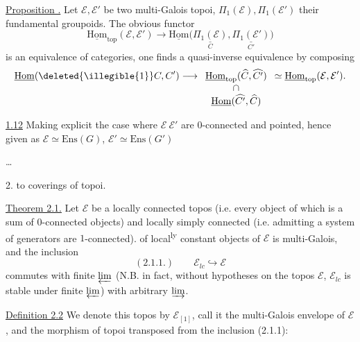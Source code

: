 
\uline{Proposition .} Let $\mathcal E,\mathcal E'$ be two multi-Galois topoi, $\Pi_1(\mathcal E),\Pi_1(\mathcal E')$ their fundamental groupoids. The obvious functor
\[
\underline{\mathrm{Hom}}_{\mathrm{top}}(\mathcal E,\mathcal E')
\longrightarrow
\underline{\mathrm{Hom}}\bigl(
\underset{C}{\underline{\Pi_1(\mathcal E)}},
\underset{C'}{\underline{\Pi_1(\mathcal E')}}\bigr)
\]
is an equivalence of categories, one finds a quasi-inverse equivalence by composing
\[
\underline{\mathrm{Hom}}(\deleted{\illegible{1}}C,C')
\longrightarrow
\begin{array}[t]{c}
\underline{\mathrm{Hom}}_{\mathrm{top}}(\widehat C,\widehat {C'})\\
\cap\\
\underline{\mathrm{Hom}}(\widehat {C'},\widehat C)
\end{array}
\simeq
\underline{\mathrm{Hom}}_{\mathrm{top}}(\mathcal E,\mathcal E').
\]

\uline{1.12} Making explicit the case where $\mathcal E\ \mathcal E'$ are $0$-connected and pointed, hence given as $\mathcal E\simeq\mathrm{Ens}(G)$, $\mathcal E'\simeq\mathrm{Ens}(G')$

\dots



2.  to coverings of topoi.

\uline{Theorem 2.1.} Let $\mathcal E$ be a locally connected topos (i.e. every object of which is a sum of $0$-connected objects) and locally simply connected (i.e. admitting a system of generators  are $1$-connected).
 of local\textsuperscript{ly} constant objects of $\mathcal E$ is  multi-Galois, and the inclusion
\[
(2.1.1.)\qquad \mathcal E_{lc}\hookrightarrow\mathcal E
\]
commutes with finite $\varprojlim$ (N.B. in fact, without hypotheses on the topos $\mathcal E$, $\mathcal E_{lc}$ is stable under finite $\varprojlim$)  with arbitrary $\varinjlim$.

\uline{Definition 2.2} We denote this topos by $\mathcal E_{[1]}$, call it the multi-Galois envelope of $\mathcal E$, and the morphism of topoi transposed from the inclusion (2.1.1):

